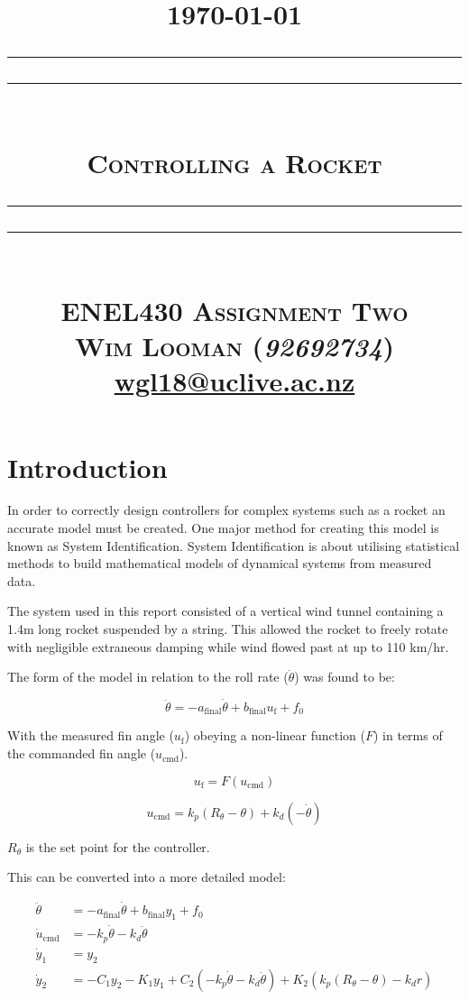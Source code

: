\documentclass[a4paper,12pt]{article}
\title{
  \centering
  \flushright\footnotesize\today\\
  \centering
  \rule{\textwidth}{1.6pt}\vspace*{-\baselineskip}\vspace*{2pt}
  \rule{\textwidth}{0.4pt}\\[\baselineskip]
  {\Huge \scshape
    Controlling a Rocket\\[10pt]
  }
  \rule{\textwidth}{0.4pt}\vspace*{-\baselineskip}\vspace*{3.2pt}
  \rule{\textwidth}{1.6pt}\\[0.5\baselineskip]
  {\scshape \large
    ENEL430 Assignment Two\\
  }
  \vspace*{1.5\baselineskip}
  {\Large
    {\scshape Wim Looman} (\emph{92692734})\\
    \href{mailto:wgl18@uclive.ac.nz}{wgl18@uclive.ac.nz}\\
  }
}
\author{
  \vspace*{-2\baselineskip}
}
\date{
  \vspace*{-2\baselineskip}
}
\begin{document}
  \maketitle

  \section{Introduction}

    In order to correctly design controllers for complex systems such as a
    rocket an accurate model must be created.  One major method for creating
    this model is known as System Identification.  System Identification is
    about utilising statistical methods to build mathematical models of
    dynamical systems from measured data.

    The system used in this report consisted of a vertical wind tunnel
    containing a 1.4m long rocket suspended by a string.  This allowed the
    rocket to freely rotate with negligible extraneous damping while wind flowed
    past at up to 110 km/hr.

    The form of the model in relation to the roll rate ($\dot\theta$) was found to be:

    \begin{equation}
      \ddot\theta = -a_\text{final}\dot\theta + b_\text{final} u_\text{f} + f_0
    \end{equation}

    With the measured fin angle ($u_\text{f}$) obeying a non-linear function ($F$) in
    terms of the commanded fin angle ($u_\text{cmd}$).

    \begin{equation}
      u_\text{f} = F\left(u_\text{cmd}\right)
    \end{equation}

    \begin{equation}
      u_\text{cmd} = k_p \left(R_\theta - \theta\right) + k_d \left(-\dot\theta\right)
    \end{equation}

    $R_\theta$ is the set point for the controller.

    This can be converted into a more detailed model:

    \begin{align}
      \ddot\theta &= -a_\text{final}\dot\theta + b_\text{final} y_1 + f_0 \\
      \dot u_\text{cmd} &= -k_p \dot\theta - k_d \ddot\theta \\
      \dot y_1 &= y_2 \\
      \dot y_2 &= -C_1 y_2 - K_1 y_1 + C_2 \left(-k_p \dot\theta - k_d \ddot\theta \right) + K_2 \left( k_p \left( R_\theta - \theta \right) - k_d r \right)
    \end{align}
\end{document}
